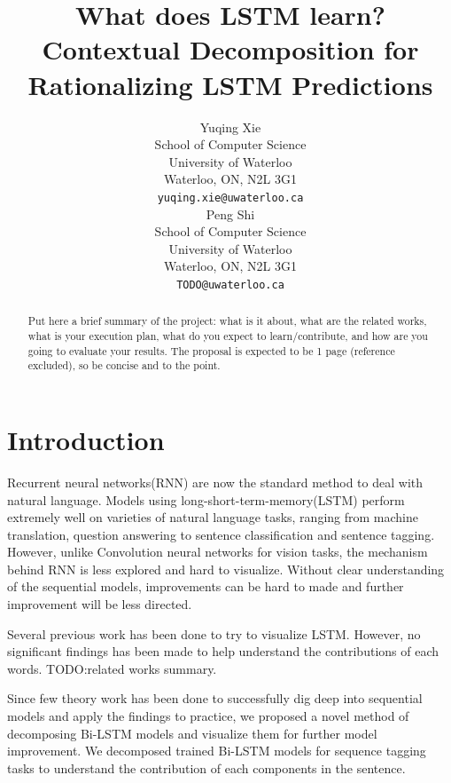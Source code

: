 \documentclass{article}
\title{What does LSTM learn? Contextual Decomposition for Rationalizing LSTM Predictions}
\author{
	Yuqing Xie \\
	School of Computer Science\\
	University of Waterloo\\
	Waterloo, ON, N2L 3G1 \\
	\texttt{yuqing.xie@uwaterloo.ca} \\
	\And
	Peng Shi\\
	School of Computer Science\\
	University of Waterloo\\
	Waterloo, ON, N2L 3G1 \\
	\texttt{TODO@uwaterloo.ca} \\
}
\begin{document}
\maketitle


\begin{abstract}

Put here a brief summary of the project: what is it about, what are the related works, what is your execution plan, what do you expect to learn/contribute, and how are you going to evaluate your results. The proposal is expected to be 1 page (reference excluded), so be concise and to the point. 

\end{abstract}

\section{Introduction}

Recurrent neural networks(RNN) are now the standard method to deal with natural language. Models using long-short-term-memory(LSTM) perform extremely well on varieties of natural language tasks, ranging from machine translation, question answering to sentence classification and sentence tagging. However, unlike Convolution neural networks for vision tasks, the mechanism behind RNN is less explored and hard to visualize. Without clear understanding of the sequential models, improvements can be hard to made and further improvement will be less directed. 

Several previous work has been done to try to visualize LSTM. However, no significant findings has been made to help understand the contributions of each words. 
TODO:related works summary.

Since few theory work has been done to successfully dig deep into sequential models and apply the findings to practice, we proposed a novel method of decomposing Bi-LSTM models and visualize them for further model improvement. We decomposed trained Bi-LSTM models for sequence tagging tasks to understand the contribution of each components in the sentence. %
\end{document}
